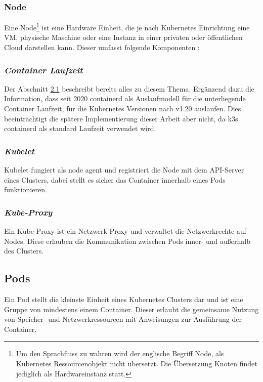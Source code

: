 \subsubsection{Node}
Eine Node\footnote{Um den Sprachfluss zu wahren wird der englische Begriff Node, als Kubernetes Ressourcenobjekt nicht übersetzt. 
Die Übersetzung Knoten findet jediglich als Hardwareinstanz statt.} 
ist eine Hardware Einheit, die je nach Kubernetes Einrichtung eine VM, physische Maschine oder 
eine Instanz in einer privaten oder öffentlichen Cloud darstellen kann.
Dieser umfasst folgende Komponenten \cite{kubernetesnodes}:

\subsubsection{\textit{Container Laufzeit}}
Der Abschnitt \hyperref[Docker]{2.1} beschreibt bereits alles zu diesem Thema.
Ergänzend dazu die Information, dass seit 2020 containerd als Auslaufmodell für die unterliegende Container Laufzeit, 
für die Kubernetes Versionen nach v1.20 auslaufen. Dies beeinträchtigt die spätere Implementierung dieser Arbeit aber nicht,
da k3s containerd als standard Laufzeit verwendet wird.

\subsubsection{\textit{Kubelet}}
Kubelet fungiert als \glqq node agent\grqq{} und registriert die Node mit dem
API-Server eines Clusters, dabei stellt es sicher das Container innerhalb eines Pods
funktionieren.

\subsubsection{\textit{Kube-Proxy}}
Ein Kube-Proxy ist ein Netzwerk Proxy und verwaltet die Netzwerkrechte auf Nodes.
Diese erlauben die Kommunikation zwischen Pods inner- und außerhalb des Clusters.

\subsection{Pods}
Ein Pod stellt die kleinste Einheit eines Kubernetes Clusters dar und ist eine Gruppe von mindestens einem Container.
Dieser erlaubt die gemeinsame Nutzung von Speicher- und Netzwerkressourcen mit Anweisungen zur Ausführung der Container.

